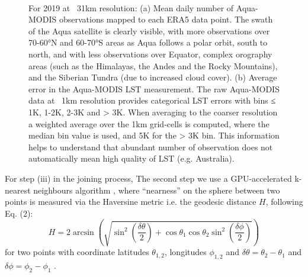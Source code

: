\documentclass[hess, twostagejnl]{copernicus}
\begin{document}
\begin{figure}
	 \\
	\caption{For 2019 at ~31km resolution: (a) Mean daily number of Aqua-MODIS observations mapped to each ERA5 data point. The swath of the Aqua satellite is clearly visible, with more observations over 70-60°N and 60-70°S areas as Aqua follows a polar orbit, south to north, and with less observations over Equator, complex orography areas (such as the Himalayas, the Andes and the Rocky Mountains), and the Siberian Tundra (due to increased cloud cover). (b) Average error in the Aqua-MODIS LST measurement. The raw Aqua-MODIS data at ~1km resolution provides categorical LST errors with bins ≤ 1K, 1-2K, 2-3K and > 3K. When averaging to the coarser resolution a weighted average over the 1km grid-cells is computed, where the median bin value is used, and 5K for the > 3K bin. This information helps to understand that abundant number of observation does not automatically mean high quality of LST (e.g. Australia).} 
	\label{fig:MODIS_time_error_N}
\end{figure}
\noindent For step (iii) in the joining process, The second step we use a GPU-accelerated k-nearest neighbours algorithm \cite{Rapids}, where “nearness” on the sphere between two points is measured via the Haversine metric i.e. the geodesic distance $H$, following Eq. (2):
\begin{equation}
	H = 2 \arcsin \left(\sqrt{\sin^2\left(\frac{\delta\theta}{2}\right) + \cos \theta_1 \cos \theta_2 \sin^2\left(\frac{\delta \phi}{2}\right) }\right)
\end{equation}
for two points with coordinate latitudes $\theta_{1,2}$, longitudes $\phi_{1,2}$ and $\delta \theta = \theta_2 - \theta_1$ and  $\delta \phi = \phi_2 - \phi_1$ . 
\end{document}
